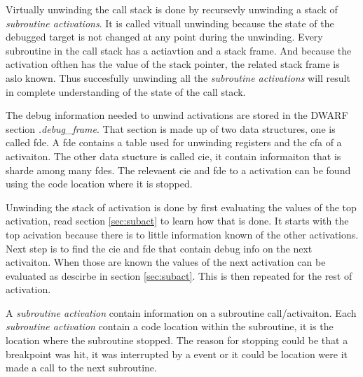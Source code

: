  


Virtually unwinding the call stack is done by recursevly unwinding a stack of \emph{subroutine activations}.
It is called vituall unwinding because the state of the debugged target is not changed at any point during the unwinding.
Every subroutine in the call stack has a actiavtion and a stack frame.
And because the activation ofthen has the value of the stack pointer, the related stack frame is aslo known.
Thus succesfully unwinding all the \emph{subroutine activations} will result in complete understanding of the state of the call stack.


The debug information needed to unwind activations are stored in the \gls{DWARF} section \emph{.debug\_frame}.
That section is made up of two data structures, one is called \gls{fde}.
A \gls{fde} contains a table used for unwinding registers and the \gls{cfa} of a activaiton.
The other data stucture is called \gls{cie}, it contain informaiton that is sharde among many \glspl{fde}.
The relevaent \gls{cie} and \gls{fde} to a activation can be found using the code location where it is stopped.


Unwinding the stack of activation is done by first evaluating the values of the top activation, read section \ref{sec:subact} to learn how that is done.
It starts with the top acivation because there is to little information known of the other activations.
Next step is to find the \gls{cie} and \gls{fde} that contain debug info on the next activaiton.
When those are known the values of the next activation can be evaluated as descirbe in section \ref{sec:subact}.
This is then repeated for the rest of activation.


 \label{sec:subact}
A \emph{subroutine activation} contain information on a subroutine call/activaiton.
Each \emph{subroutine activation} contain a code location within the subroutine, it is the location where the subroutine stopped.
The reason for stopping could be that a breakpoint was hit, it was interrupted by a event or it could be location were it made a call to the next subroutine.


